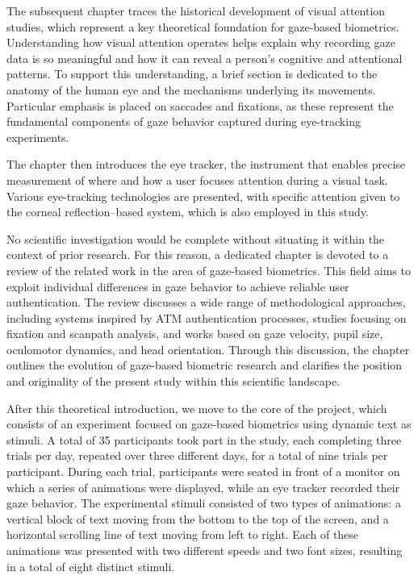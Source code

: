 \documentclass[12pt]{report}
\begin{document}
The subsequent chapter traces the historical development of visual attention studies, which represent a key theoretical foundation for gaze-based biometrics. 
Understanding how visual attention operates helps explain why recording gaze data is so meaningful and how it can reveal a person’s cognitive and attentional patterns. 
To support this understanding, a brief section is dedicated to the anatomy of the human eye and the mechanisms underlying its movements. 
Particular emphasis is placed on saccades and fixations, as these represent the fundamental components of gaze behavior captured during eye-tracking experiments.

The chapter then introduces the eye tracker, the instrument that enables precise measurement of where and how a user focuses attention during a visual task. 
Various eye-tracking technologies are presented, with specific attention given to the corneal reflection–based system, which is also employed in this study.

No scientific investigation would be complete without situating it within the context of prior research. 
For this reason, a dedicated chapter is devoted to a review of the related work in the area of gaze-based biometrics. 
This field aims to exploit individual differences in gaze behavior to achieve reliable user authentication. 
The review discusses a wide range of methodological approaches, including systems inspired by ATM authentication processes, studies focusing on fixation and scanpath analysis, and works based on gaze velocity, pupil size, oculomotor dynamics, and head orientation.
Through this discussion, the chapter outlines the evolution of gaze-based biometric research and clarifies the position and originality of the present study within this scientific landscape.

After this theoretical introduction, we move to the core of the project, which consists of an experiment focused on gaze-based biometrics using dynamic text as stimuli.
A total of 35 participants took part in the study, each completing three trials per day, repeated over three different days, for a total of nine trials per participant.
During each trial, participants were seated in front of a monitor on which a series of animations were displayed, while an eye tracker recorded their gaze behavior.
The experimental stimuli consisted of two types of animations: a vertical block of text moving from the bottom to the top of the screen, and a horizontal scrolling line of text moving from left to right.
Each of these animations was presented with two different speeds and two font sizes, resulting in a total of eight distinct stimuli.
\end{document}
